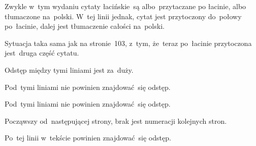\documentclass[a4paper,11pt]{article}
\begin{document}
\vspace{\spaceFour}


\start {} Zwykle w~tym wydaniu cytaty łacińskie~są
albo~przytaczane po łacinie, albo tłumaczone na~polski. W~tej linii
jednak, cytat jest przytoczony do~połowy po~łacinie, dalej jest
tłumaczenie całości na~polski.

\vspace{\spaceFour}


\start {} Sytuacja taka sama jak na stronie~103, z~tym,
że~teraz po~łacinie przytoczona jest~druga część cytatu.

\vspace{\spaceFour}


\start {} Odstęp między tymi
liniami jest za~duży.

\vspace{\spaceFour}


\start {} Pod~tymi liniami nie powinien
znajdować~się odstęp.

\vspace{\spaceFour}


\start {} Pod~tymi liniami nie powinien
znajdować~się odstęp.

\vspace{\spaceFour}


\start {} Począwszy od~następującej strony, brak jest numeracji
kolejnych stron.

\vspace{\spaceFour}


\start {} Po~tej linii w~tekście powinien znajdować~się
odstęp.

\vspace{\spaceFour}





\end{document}

